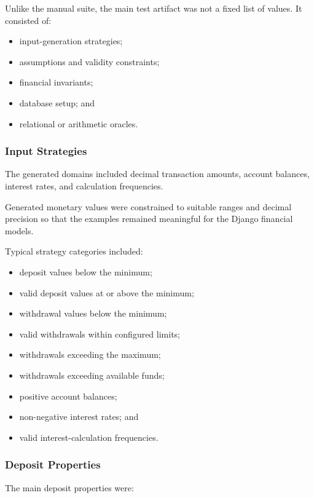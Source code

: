 \documentclass[12pt]{article}
\begin{document}
Unlike the manual suite, the main test artifact was not a fixed list of values.
It consisted of:

\begin{itemize}
    \item input-generation strategies;
    \item assumptions and validity constraints;
    \item financial invariants;
    \item database setup; and
    \item relational or arithmetic oracles.
\end{itemize}

\subsubsection{Input Strategies}

The generated domains included decimal transaction amounts, account balances,
interest rates, and calculation frequencies.

Generated monetary values were constrained to suitable ranges and decimal
precision so that the examples remained meaningful for the Django financial
models.

Typical strategy categories included:

\begin{itemize}
    \item deposit values below the minimum;
    \item valid deposit values at or above the minimum;
    \item withdrawal values below the minimum;
    \item valid withdrawals within configured limits;
    \item withdrawals exceeding the maximum;
    \item withdrawals exceeding available funds;
    \item positive account balances;
    \item non-negative interest rates; and
    \item valid interest-calculation frequencies.
\end{itemize}

\subsubsection{Deposit Properties}

The main deposit properties were:
\end{document}
